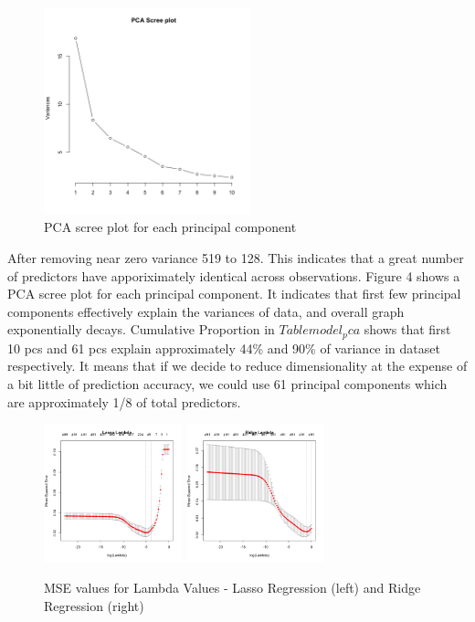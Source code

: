 \documentclass[letterpaper, 10 pt, conference]{ieeeconf}\usepackage[]{graphicx}\usepackage[]{color}
\begin{document}
   \begin{figure}[thpb]
      \centering
      \includegraphics[width =  6cm, height = 6cm]{../images/model_pca_scree_plot.png}
      \caption{PCA scree plot for each principal component}
      \label{figurelabel}
   \end{figure}

After removing near zero variance 519 to 128. This indicates that a great number of predictors have apporiximately identical across observations. Figure 4 shows a PCA scree plot for each principal component. It indicates that first few principal components effectively explain the variances of data, and overall graph exponentially decays. Cumulative Proportion in $Table model_pca$ shows that first 10 pcs and 61 pcs explain approximately 44\% and 90\% of variance in dataset respectively. It means that if we decide to reduce dimensionality at the expense of a bit little of prediction accuracy, we could use 61 principal components which are approximately 1/8 of total predictors. 

   \begin{figure}[thpb]
      \centering
      \includegraphics[width =  4cm, height = 4cm]{../images/model_lasso_lambda.png}
      \includegraphics[width =  4cm, height = 4cm]{../images/model_ridge_lambda.png}
      \caption{MSE values for Lambda Values - Lasso Regression (left) and Ridge Regression (right)}
      \label{figurelabel}
   \end{figure}
\end{document}

